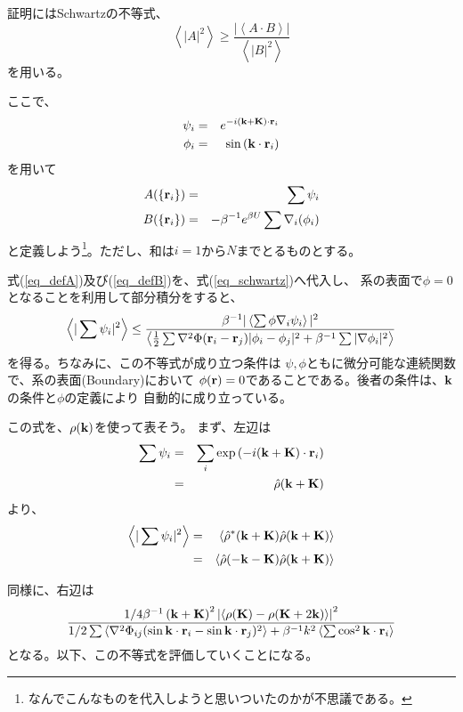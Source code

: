 \documentclass{jarticle}
\renewcommand{\v}[1]{{\bf #1}}
\newcommand{\ave}[1]{\left< #1 \right>}
\begin{document}
証明にはSchwartzの不等式、
\begin{equation}
  \ave{|A|^2} \ge \frac{|\ave{A \cdot B}|}{\ave{|B|^2}}
  \label{eq_schwartz}
\end{equation}
を用いる。

ここで、
\begin{eqnarray}
  \psi_i &=& e^{-i(\v{k} + \v{K}) \cdot \v{r}_i} \\
  \phi_i &=& \sin{(\v{k} \cdot \v{r}_i)}
\end{eqnarray}
を用いて
\begin{eqnarray}
  A(\{\v{r}_i \}) &=& \sum \psi_i\\ \label{eq_defA}
  B(\{\v{r}_i \}) &=& -\beta^{-1} e^{\beta U} \sum \nabla_i (\phi_i) \label{eq_defB}
\end{eqnarray}
と定義しよう\footnote{
  なんでこんなものを代入しようと思いついたのかが不思議である。
}。ただし、和は$i=1$から$N$までとるものとする。

式(\ref{eq_defA})及び(\ref{eq_defB})を、式(\ref{eq_schwartz})へ代入し、
系の表面で$\phi = 0$となることを利用して部分積分をすると、
\begin{equation}
  \ave{|\sum \psi_i |^2} \le
  \frac{\beta^{-1} |\ave{ \sum \phi \nabla_i \psi_i }|^2 }
  {
    \ave{
      \frac{1}{2}\sum \nabla^2 \Phi(\v{r}_i-\v{r}_j) |\phi_i-\phi_j|^2
      + \beta^{-1} \sum | \nabla \phi_i|^2
    }
  }
  \label{eq_ineq}
\end{equation}
を得る。ちなみに、この不等式が成り立つ条件は
$\psi,\phi$ともに微分可能な連続関数で、系の表面(Boundary)において
$\phi(\v{r}) = 0$であることである。後者の条件は、$\v{k}$の条件と$\phi$の定義により
自動的に成り立っている。

この式を、$\rho(\v{k})$を使って表そう。
まず、左辺は
\begin{eqnarray}
  \sum \psi_i &=& \sum_i \exp{(-i (\v{k}+\v{K}) \cdot \v{r}_i)} \\
  &=& \hat{\rho}(\v{k}+\v{K})
\end{eqnarray}
より、
\begin{eqnarray}
  \ave{| \sum \psi_i |^2} &=& \ave{\hat{\rho}^*(\v{k}+\v{K}) \hat{\rho}(\v{k}+\v{K})}\\
  & = & \ave{\hat{\rho}(-\v{k}-\v{K}) \hat{\rho}(\v{k}+\v{K})}
\end{eqnarray}

同様に、右辺は
\begin{equation}
  \frac{
  1/4 \beta^{-1} \left( \v{k} + \v{K} \right)^2
  \left|
  \ave{ \rho(\v{K})-\rho(\v{K}+2\v{k}) }
  \right|^2
  }{
  1/2 \sum
  \ave{
    \nabla^2 \Phi_{ij}
    (
    \sin{ \v{k} \cdot \v{r}_i} - \sin{\v{k}\cdot \v{r}_j}
    )^2
  }
  + \beta^{-1} k^2 \ave{\sum \cos^2{\v{k}\cdot\v{r}_i}}
  }
  \label{eq_bigfrac}
\end{equation}
となる。以下、この不等式を評価していくことになる。
\end{document}
